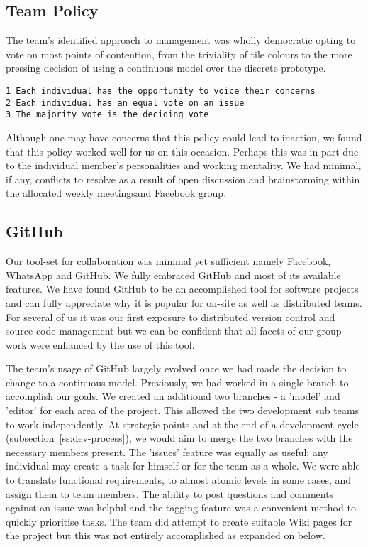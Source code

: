 \subsection{Team Policy}
The team's identified approach to management was wholly democratic opting to vote on most points of contention, from the triviality of tile colours to the more pressing decision of using a continuous model over the discrete prototype.

\begin{lstlisting}[caption={Decision Making Agreement}]
1 Each individual has the opportunity to voice their concerns
2 Each individual has an equal vote on an issue
3 The majority vote is the deciding vote
\end{lstlisting}
 
Although one may have concerns that this policy could lead to inaction, we found that this policy worked well for us on this occasion. Perhaps this was in part due to the individual member's personalities and working mentality. We had minimal, if any, conflicts to resolve as a result of open discussion and brainstorming within the allocated weekly meetings\footnotemark[02] and Facebook group.

\subsection{GitHub}
Our tool-set for collaboration was minimal yet sufficient namely Facebook, WhatsApp and GitHub. We fully embraced GitHub and most of its available features. We have found GitHub to be an accomplished tool for software projects and can fully appreciate why it is popular for on-site as well as distributed teams. For several of us it was our first exposure to distributed version control and source code management but we can be confident that all facets of our group work were enhanced by the use of this tool.

The team's usage of GitHub largely evolved once we had made the decision to change to a continuous model. Previously, we had worked in a single branch to accomplish our goals. We created an additional two branches - a 'model' and 'editor' for each area of the project.  This allowed the two development sub teams to work independently. At strategic points and at the end of a development cycle (subsection~\ref{ss:dev-process}), we would aim to merge the two branches with the necessary members present. The 'issues' feature was equally as useful; any individual may create a task for himself or for the team as a whole. We were able to translate functional requirements, to almost atomic levels in some cases, and assign them to team members. The ability to post questions and comments against an issue was helpful and the tagging feature was a convenient method to quickly prioritise tasks. The team  did attempt to create suitable Wiki pages for the project but this was not entirely accomplished as expanded on below.

